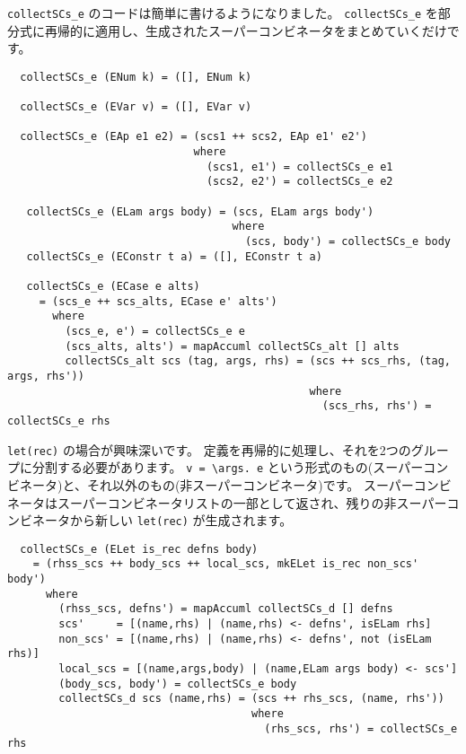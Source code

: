 \documentclass{jarticle}
\begin{document}
\texttt{collectSCs\_e} のコードは簡単に書けるようになりました。
\texttt{collectSCs\_e} を部分式に再帰的に適用し、生成されたスーパーコンビネータをまとめていくだけです。

\begin{verbatim}
  collectSCs_e (ENum k) = ([], ENum k)

  collectSCs_e (EVar v) = ([], EVar v)

  collectSCs_e (EAp e1 e2) = (scs1 ++ scs2, EAp e1' e2')
                             where
                               (scs1, e1') = collectSCs_e e1
                               (scs2, e2') = collectSCs_e e2

   collectSCs_e (ELam args body) = (scs, ELam args body')
                                   where
                                     (scs, body') = collectSCs_e body
   collectSCs_e (EConstr t a) = ([], EConstr t a)

   collectSCs_e (ECase e alts)
     = (scs_e ++ scs_alts, ECase e' alts')
       where
         (scs_e, e') = collectSCs_e e
         (scs_alts, alts') = mapAccuml collectSCs_alt [] alts
         collectSCs_alt scs (tag, args, rhs) = (scs ++ scs_rhs, (tag, args, rhs'))
                                               where
                                                 (scs_rhs, rhs') = collectSCs_e rhs
\end{verbatim}

\texttt{let(rec)} の場合が興味深いです。
定義を再帰的に処理し、それを2つのグループに分割する必要があります。
\texttt{v = \textbackslash args. e} という形式のもの(スーパーコンビネータ)と、それ以外のもの(非スーパーコンビネータ)です。
スーパーコンビネータはスーパーコンビネータリストの一部として返され、残りの非スーパーコンビネータから新しい \texttt{let(rec)} が生成されます。

\begin{verbatim}
  collectSCs_e (ELet is_rec defns body)
    = (rhss_scs ++ body_scs ++ local_scs, mkELet is_rec non_scs' body')
      where
        (rhss_scs, defns') = mapAccuml collectSCs_d [] defns
        scs'     = [(name,rhs) | (name,rhs) <- defns', isELam rhs]
        non_scs' = [(name,rhs) | (name,rhs) <- defns', not (isELam rhs)]
        local_scs = [(name,args,body) | (name,ELam args body) <- scs']
        (body_scs, body') = collectSCs_e body
        collectSCs_d scs (name,rhs) = (scs ++ rhs_scs, (name, rhs'))
                                      where
                                        (rhs_scs, rhs') = collectSCs_e rhs
\end{verbatim}
\end{document}
